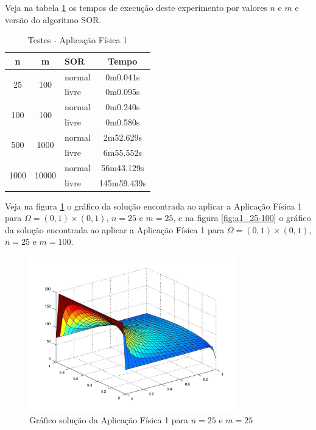 \documentclass[
	11pt,				%
	oneside,			%
	a4paper,			%
	english,			%
	brazil,				%
	]{article}
\begin{document}
Veja na tabela \ref{tab:taf1} os tempos de execução deste experimento por 
valores $n$ e $m$ e versão do algoritmo SOR.

\begin{table}[ht]
\centering
\begin{tabular}{|c|c|l|c|}
\hline 
\textbf{n} & \textbf{m} & \textbf{SOR} & \textbf{Tempo} \\
\hline
\multirow{2}{*}{25}    & \multirow{2}{*}{100}   & normal & 0m0.041s \\
                       &                        & livre  & 0m0.095s \\
\hline
\multirow{2}{*}{100}   & \multirow{2}{*}{100}   & normal & 0m0.240s \\
                       &                        & livre  & 0m0.580s \\
\hline
\multirow{2}{*}{500}   & \multirow{2}{*}{1000}  & normal & 2m52.629s \\
                       &                        & livre  & 6m55.552s \\
\hline
\multirow{2}{*}{1000}  & \multirow{2}{*}{10000} & normal & 56m43.129s \\
                       &                        & livre  & 145m59.439s \\
\hline
\end{tabular}
\caption{Testes - Aplicação Física 1}
\label{tab:taf1}
\end{table}

Veja na figura \ref{fig:a1_25-25} o gráfico da solução encontrada ao aplicar 
a Aplicação Física 1 para $\Omega = (0,1)\times(0,1)$, $n = 25$ e $m = 25$, e 
na figura \ref{fig:a1_25-100} o gráfico da solução encontrada ao aplicar 
a Aplicação Física 1 para $\Omega = (0,1)\times(0,1)$, $n = 25$ e $m = 100$.

\begin{figure}[h]
    \centering
    \includegraphics[width=0.8\textwidth]{a1_25-25}
    \caption{Gráfico solução da Aplicação Física 1 para $n = 25$ e $m = 25$}
    \label{fig:a1_25-25}
\end{figure}
\end{document}
